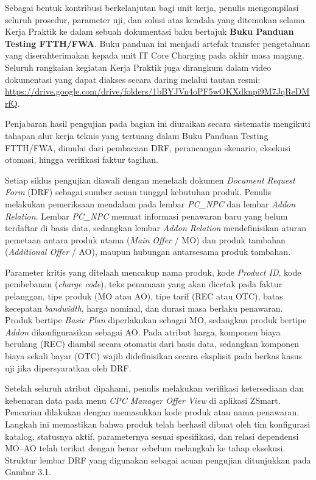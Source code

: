 \documentclass[12pt,a4paper]{article}
\begin{document}
Sebagai bentuk kontribusi berkelanjutan bagi unit kerja, penulis mengompilasi seluruh prosedur, parameter uji, dan solusi atas kendala yang ditemukan selama Kerja Praktik ke dalam sebuah dokumentasi baku bertajuk \textbf{Buku Panduan Testing FTTH/FWA}. Buku panduan ini menjadi artefak transfer pengetahuan yang diserahterimakan kepada unit IT Core Charging pada akhir masa magang. Seluruh rangkaian kegiatan Kerja Praktik juga dirangkum dalam video dokumentasi yang dapat diakses secara daring melalui tautan resmi: \url{https://drive.google.com/drive/folders/1bBYJVn4oPF5wOKXdknpi9M7JqReDMrfQ}.

\vspace{0.4cm}
Penjabaran hasil pengujian pada bagian ini diuraikan secara sistematis mengikuti tahapan alur kerja teknis yang tertuang dalam Buku Panduan Testing FTTH/FWA, dimulai dari pembacaan DRF, perancangan skenario, eksekusi otomasi, hingga verifikasi faktur tagihan.

\vspace{0.2cm}
Setiap siklus pengujian diawali dengan menelaah dokumen \textit{Document Request Form} (DRF) sebagai sumber acuan tunggal kebutuhan produk. Penulis melakukan pemeriksaan mendalam pada lembar \textit{PC\_NPC} dan lembar \textit{Addon Relation}. Lembar \textit{PC\_NPC} memuat informasi penawaran baru yang belum terdaftar di basis data, sedangkan lembar \textit{Addon Relation} mendefinisikan aturan pemetaan antara produk utama (\textit{Main Offer} / MO) dan produk tambahan (\textit{Additional Offer} / AO), maupun hubungan antarsesama produk tambahan.

Parameter kritis yang ditelaah mencakup nama produk, kode \textit{Product ID}, kode pembebanan (\textit{charge code}), teks penamaan yang akan dicetak pada faktur pelanggan, tipe produk (MO atau AO), tipe tarif (REC atau OTC), batas kecepatan \textit{bandwidth}, harga nominal, dan durasi masa berlaku penawaran. Produk bertipe \textit{Basic Plan} diperlakukan sebagai MO, sedangkan produk bertipe \textit{Addon} dikonfigurasikan sebagai AO. Pada atribut harga, komponen biaya berulang (REC) diambil secara otomatis dari basis data, sedangkan komponen biaya sekali bayar (OTC) wajib didefinisikan secara eksplisit pada berkas kasus uji jika dipersyaratkan oleh DRF.

Setelah seluruh atribut dipahami, penulis melakukan verifikasi ketersediaan dan kebenaran data pada menu \textit{CPC Manager Offer View} di aplikasi ZSmart. Pencarian dilakukan dengan memasukkan kode produk atau nama penawaran. Langkah ini memastikan bahwa produk telah berhasil dibuat oleh tim konfigurasi katalog, statusnya aktif, parameternya sesuai spesifikasi, dan relasi dependensi MO--AO telah terikat dengan benar sebelum melangkah ke tahap eksekusi. Struktur lembar DRF yang digunakan sebagai acuan pengujian ditunjukkan pada Gambar 3.1.
\end{document}
